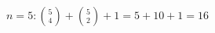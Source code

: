 \documentclass[preview]{standalone}
\begin{document}
\begin{align*}
n=5: \binom{5}{4} + \binom{5}{2} + 1 = 5 + 10 + 1 = 16
\end{align*}
\end{document}

